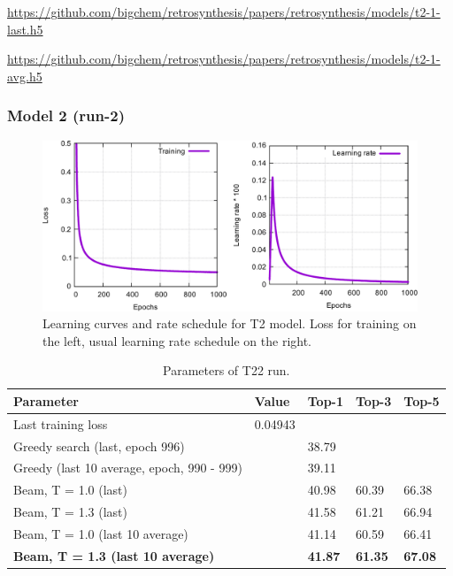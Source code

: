 \documentclass{article}
\begin{document}
\url{https://github.com/bigchem/retrosynthesis/papers/retrosynthesis/models/t2-1-last.h5}

\url{https://github.com/bigchem/retrosynthesis/papers/retrosynthesis/models/t2-1-avg.h5}

\newpage
 \subsubsection{Model 2 (run-2)}
 
\begin{figure}[h!]
  \centering
  \includegraphics[width = 16.5cm]{images/t2-2.pdf}
  \caption{Learning curves and rate schedule for T2 model. Loss for training on the left, usual learning rate schedule on the right.}
  \label{fig:t21}
\end{figure}

\begin{table}[h!]
\caption{Parameters of T22 run.}
  \centering
  \begin{tabular}{p{8.2cm}p{1.5cm}p{1.5cm}p{1.5cm}p{1.5cm}}
    \toprule
    Parameter & Value & Top-1 & Top-3 & Top-5 \\
    \midrule
    Last training loss & 0.04943 & & & \\
    \midrule
    Greedy search (last, epoch 996) & & 38.79 & & \\
    Greedy (last 10 average, epoch, 990 - 999) & & 39.11 & & \\
    \midrule
    Beam, T = 1.0 (last) & & 40.98 & 60.39 & 66.38  \\
    Beam, T = 1.3 (last) & & 41.58 &  61.21 & 66.94 \\ 
    \midrule
    Beam, T = 1.0 (last 10 average) & & 41.14  & 60.59 &  66.41\\
    \textbf{Beam, T = 1.3 (last 10 average)} & &  \textbf{41.87} &  \textbf{61.35} &  \textbf{67.08}\\ 
    \bottomrule
  \end{tabular}
  \label{tbl:t22}

\end{table} 
\end{document}
